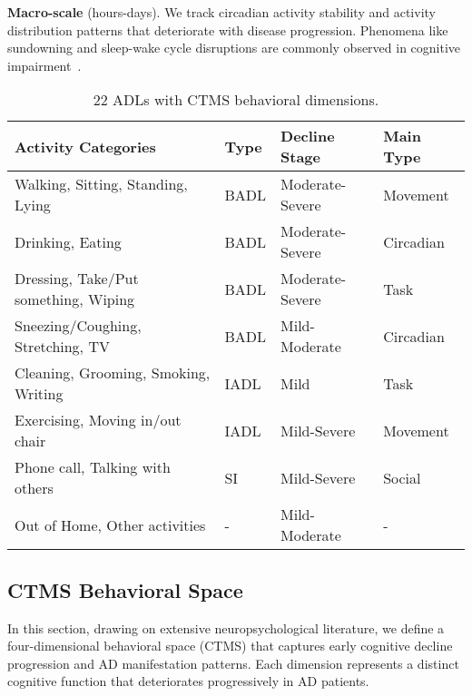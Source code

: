 \documentclass[sigconf, anonymous, 9pt, nonacm]{acmart}
\begin{document}
\noindent\textbf{Macro-scale} (hours-days). We track circadian activity stability and activity distribution patterns that deteriorate with disease progression. Phenomena like sundowning and sleep-wake cycle disruptions are commonly observed in cognitive impairment~\cite{Khachiyants2011Sundown,Musiek2015Sleep}.

\begin{table}[t]
\centering
\scriptsize
\begin{tabular}{@{}p{3.8cm}p{0.8cm}p{1.5cm}p{1.5cm}@{}}
\toprule
\textbf{Activity Categories} & \textbf{Type} & \textbf{Decline Stage} & \textbf{Main Type} \\
\midrule
Walking, Sitting, Standing, Lying & BADL & Moderate-Severe & Movement \\
Drinking, Eating & BADL & Moderate-Severe & Circadian \\
Dressing, Take/Put something, Wiping & BADL & Moderate-Severe & Task \\
Sneezing/Coughing, Stretching, TV & BADL & Mild-Moderate & Circadian \\
Cleaning, Grooming, Smoking, Writing & IADL & Mild & Task \\
Exercising, Moving in/out chair & IADL & Mild-Severe & Movement \\
Phone call, Talking with others & SI & Mild-Severe & Social \\
Out of Home, Other activities & - & Mild-Moderate & - \\
\bottomrule
\end{tabular}
\caption{22 ADLs with CTMS behavioral dimensions.}
\label{tab:activities}

\vspace{-3em}
\end{table}

\subsection{CTMS Behavioral Space}

In this section, drawing on extensive neuropsychological literature, we define a four-dimensional behavioral space (CTMS) that captures early cognitive decline progression and AD manifestation patterns. 
Each dimension represents a distinct cognitive function that deteriorates progressively in AD patients.
\end{document}
